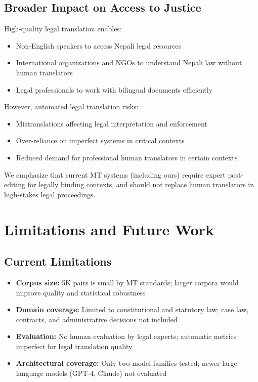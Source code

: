 \documentclass[manuscript, screen, review]{acmart}
\begin{document}
\subsection{Broader Impact on Access to Justice}
\label{subsec:broader_impact}

High-quality legal translation enables:

\begin{itemize}
\item Non-English speakers to access Nepali legal resources

\item International organizations and NGOs to understand Nepali law without human translators

\item Legal professionals to work with bilingual documents efficiently
\end{itemize}

However, automated legal translation risks:

\begin{itemize}
\item Mistranslations affecting legal interpretation and enforcement

\item Over-reliance on imperfect systems in critical contexts

\item Reduced demand for professional human translators in certain contexts
\end{itemize}

We emphasize that current MT systems (including ours) require expert post-editing for legally binding contexts, and should not replace human translators in high-stakes legal proceedings.

\section{Limitations and Future Work}
\label{sec:limitations}

\subsection{Current Limitations}
\label{subsec:current_limitations}

\begin{itemize}
\item \textbf{Corpus size:} 5K pairs is small by MT standards; larger corpora would improve quality and statistical robustness

\item \textbf{Domain coverage:} Limited to constitutional and statutory law; case law, contracts, and administrative decisions not included

\item \textbf{Evaluation:} No human evaluation by legal experts; automatic metrics imperfect for legal translation quality

\item \textbf{Architectural coverage:} Only two model families tested; newer large language models (GPT-4, Claude) not evaluated
\end{itemize}
\end{document}

